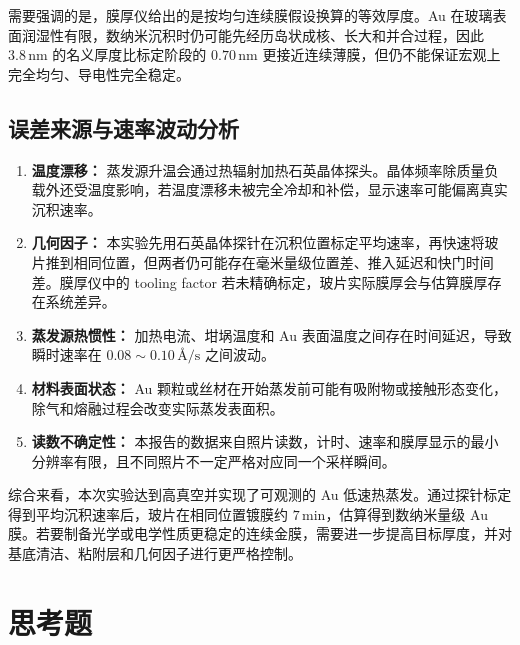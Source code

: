 \documentclass[11pt]{article}
\newcommand{\Ang}{\text{\AA}}
\begin{document}
需要强调的是，膜厚仪给出的是按均匀连续膜假设换算的等效厚度。Au 在玻璃表面润湿性有限，数纳米沉积时仍可能先经历岛状成核、长大和并合过程，因此 $3.8\,\mathrm{nm}$ 的名义厚度比标定阶段的 $0.70\,\mathrm{nm}$ 更接近连续薄膜，但仍不能保证宏观上完全均匀、导电性完全稳定。

\subsection{误差来源与速率波动分析}

\begin{enumerate}
    \item \textbf{温度漂移：} 蒸发源升温会通过热辐射加热石英晶体探头。晶体频率除质量负载外还受温度影响，若温度漂移未被完全冷却和补偿，显示速率可能偏离真实沉积速率。
    \item \textbf{几何因子：} 本实验先用石英晶体探针在沉积位置标定平均速率，再快速将玻片推到相同位置，但两者仍可能存在毫米量级位置差、推入延迟和快门时间差。膜厚仪中的 tooling factor 若未精确标定，玻片实际膜厚会与估算膜厚存在系统差异。
    \item \textbf{蒸发源热惯性：} 加热电流、坩埚温度和 Au 表面温度之间存在时间延迟，导致瞬时速率在 $0.08\sim0.10\,\Ang/\mathrm{s}$ 之间波动。
    \item \textbf{材料表面状态：} Au 颗粒或丝材在开始蒸发前可能有吸附物或接触形态变化，除气和熔融过程会改变实际蒸发表面积。
    \item \textbf{读数不确定性：} 本报告的数据来自照片读数，计时、速率和膜厚显示的最小分辨率有限，且不同照片不一定严格对应同一个采样瞬间。
\end{enumerate}

综合来看，本次实验达到高真空并实现了可观测的 Au 低速热蒸发。通过探针标定得到平均沉积速率后，玻片在相同位置镀膜约 $7\,\mathrm{min}$，估算得到数纳米量级 Au 膜。若要制备光学或电学性质更稳定的连续金膜，需要进一步提高目标厚度，并对基底清洁、粘附层和几何因子进行更严格控制。

\section{思考题}
\end{document}
